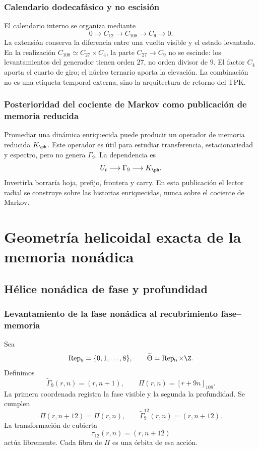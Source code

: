 \section{Calendario dodecafásico y no escisión}

El calendario interno se organiza mediante
\[
 0\longrightarrow C_{12}\longrightarrow C_{108}
 \longrightarrow C_9\longrightarrow0.
\]
La extensión conserva la diferencia entre una vuelta visible y el estado
levantado. En la realización
\(C_{108}\simeq C_{27}\times C_4\), la parte \(C_{27}\to C_9\) no se
escinde: los levantamientos del generador tienen orden \(27\), no orden
divisor de \(9\). El factor \(C_4\) aporta el cuarto de giro; el núcleo
ternario aporta la elevación. La combinación no es una etiqueta temporal
externa, sino la arquitectura de retorno del TPK.

\section{Posterioridad del cociente de Markov como publicación de memoria reducida}

Promediar una dinámica enriquecida puede producir un operador de memoria
reducida \(K_{\ph}\). Este operador es útil para estudiar transferencia,
estacionariedad y espectro, pero no genera \(\Gamma_9\). La dependencia es
\[
 U_t\longrightarrow\Gamma_9\longrightarrow K_{\ph}.
\]
Invertirla borraría hoja, prefijo, frontera y carry. En esta publicación el
lector radial se construye sobre las historias enriquecidas, nunca sobre el
cociente de Markov.

\part{Geometría helicoidal exacta de la memoria nonádica}

\chapter{Hélice nonádica de fase y profundidad}

\section{Levantamiento de la fase nonádica al recubrimiento fase--memoria}

Sea
\[
 \operatorname{Rep}_9=\{0,1,\ldots,8\},
 \qquad \widetilde\Theta=\operatorname{Rep}_9\times\Z.
\]
Definimos
\begin{equation}
 \widetilde\Gamma_9(r,n)=(r,n+1),
 \qquad
 \Pi(r,n)=[r+9n]_{108}.
 \label{espiral:eq:cobertura-helice}
\end{equation}
La primera coordenada registra la fase visible y la segunda la profundidad.
Se cumplen
\[
 \Pi(r,n+12)=\Pi(r,n),
 \qquad
 \widetilde\Gamma_9^{12}(r,n)=(r,n+12).
\]
La transformación de cubierta
\[
 \tau_{12}(r,n)=(r,n+12)
\]
actúa libremente. Cada fibra de \(\Pi\) es una órbita de esa acción.

